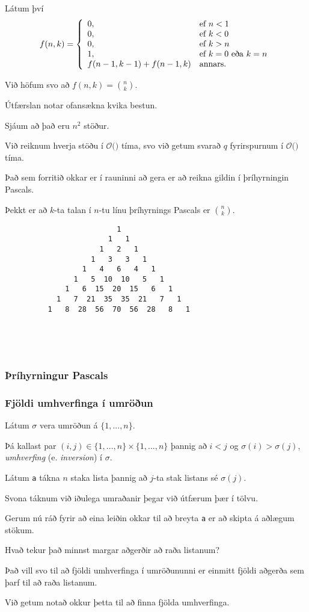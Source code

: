 {
	{
		\item<1-> Látum því
		\[
			f(n, k) = \left \{
			\env{array}
			{ {l l}
				0, & \text{ef $n < 1$}\\
				0, & \text{ef $k < 0$}\\
				0, & \text{ef $k > n$}\\
				1, & \text{ef $k = 0$ eða $k = n$}\\
				f(n - 1, k - 1) + f(n - 1, k) & \text{annars.}
			}
			\right .
		\]
		\item<2-> Við höfum svo að $f(n, k) = {n \choose k}$.
		\item<3-> Útfærslan notar ofansækna kvika bestun.
	}
}

{
}

{
	{
		\item<1-> Sjáum að það eru $n^2$ stöður.
		\item<2-> Við reiknum hverja stöðu í $\mathcal{O}($$)$ tíma, svo við getum svarað $q$ fyrirspurnum í
					$\mathcal{O}($\onslide<4->{$n^2 + q$}$)$ tíma.
		\item<5-> Það sem forritið okkar er í rauninni að gera er að reikna gildin í þríhyrningin Pascals.
		\item<6-> Þekkt er að $k$-ta talan í $n$-tu línu þríhyrnings Pascals er ${n \choose k}$.
	}
}

{ \begin{verbatim}
                          1
                        1   1
                      1   2   1
                    1   3   3   1
                  1   4   6   4   1
                1   5  10  10   5   1
              1   6  15  20  15   6   1
            1   7  21  35  35  21   7   1
          1   8  28  56  70  56  28   8   1





\end{verbatim}}
{
	\frametitle{Þríhyrningur Pascals}
	\pascal
}

{
	\frametitle{Fjöldi umhverfinga í umröðun}
	{
		\item<1-> Látum $\sigma$ vera umröðun á $\{1, ..., n\}$.
		\item<2-> Þá kallast par $(i, j) \in \{1, ..., n\} \times \{1, ..., n\}$ þannig að $i < j$ og $\sigma(i) > \sigma(j)$,
					\emph{umhverfing} (e. \emph{inversion}) í $\sigma$.
		\item<3-> Látum \texttt{a} tákna $n$ staka lista þannig að $j$-ta stak listans sé $\sigma(j)$.
		\item<4-> Svona táknum við iðulega umraðanir þegar við útfærum þær í tölvu.
		\item<5-> Gerum nú ráð fyrir að eina leiðin okkar til að breyta \texttt{a} er að skipta á aðlægum stökum.
		\item<6-> Hvað tekur það minnst margar aðgerðir að raða listanum?
		\item<7-> Það vill svo til að fjöldi umhverfinga í umröðununni er einmitt fjöldi aðgerða sem þarf til að raða listanum.
		\item<8-> Við getum notað okkur þetta til að finna fjölda umhverfinga.
	}
}

